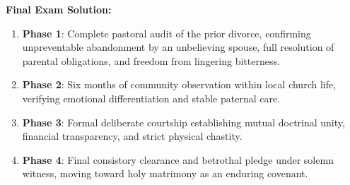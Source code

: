 \documentclass[11pt]{report}
\begin{document}
\begin{blackboard}
\textbf{Final Exam Solution:}
\begin{enumerate}
    \item \textbf{Phase 1}: Complete pastoral audit of the prior divorce, confirming unpreventable abandonment by an unbelieving spouse, full resolution of parental obligations, and freedom from lingering bitterness.
    \item \textbf{Phase 2}: Six months of community observation within local church life, verifying emotional differentiation and stable paternal care.
    \item \textbf{Phase 3}: Formal deliberate courtship establishing mutual doctrinal unity, financial transparency, and strict physical chastity.
    \item \textbf{Phase 4}: Final consistory clearance and betrothal pledge under solemn witness, moving toward holy matrimony as an enduring covenant.
\end{enumerate}
\end{blackboard}
\end{document}
